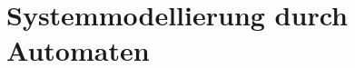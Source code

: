 \section{Systemmodellierung durch Automaten}
\label{sec:para2}
\nextlecture


\cleardoubleoddemptypage